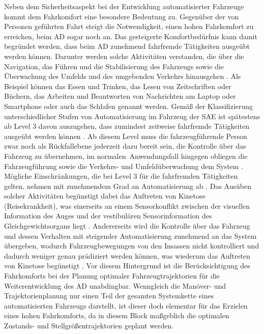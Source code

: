 Neben dem Sicherheitsaspekt bei der Entwicklung automatisierter Fahrzeuge kommt dem Fahrkomfort eine besondere Bedeutung zu. Gegenüber der von Personen geführten Fahrt steigt die Notwendigkeit, einen hohen Fahrkomfort zu erreichen, beim \gls{AD} sogar noch an. Das gesteigerte Komfortbedürfnis kann damit begründet werden, dass beim \gls{AD} zunehmend fahrfremde Tätigkeiten ausgeübt werden können. Darunter werden solche Aktivitäten verstanden, die über die Navigation, das Führen und die Stabilisierung des Fahrzeugs sowie die Überwachung des Umfelds und des umgebenden Verkehrs hinausgehen \cite{Festner.2019}. Als Beispiel können das Essen und Trinken, das Lesen von Zeitschriften oder Büchern, das Arbeiten und Beantworten von Nachrichten am Laptop oder Smartphone oder auch das Schlafen genannt werden. Gemäß der Klassifizierung unterschiedlicher Stufen von Automatisierung im Fahrzeug der \gls{SAE} \cite{SAETaxonomy.2018} ist spätestens ab Level 3 davon auszugehen, dass zumindest zeitweise fahrfremde Tätigkeiten ausgeübt werden können \cite{Festner.2019}. Ab diesem Level muss die fahrzeugführende Person zwar noch als Rückfallebene jederzeit dazu bereit sein, die Kontrolle über das Fahrzeug zu übernehmen, im \glqq normalen\grqq~Anwendungsfall hingegen obliegen die Fahrzeugführung sowie die Verkehrs- und Umfeldüberwachung dem System \cite{SAETaxonomy.2018}. Mögliche Einschränkungen, die bei Level 3 für die fahrfremden Tätigkeiten gelten, nehmen mit zunehmendem Grad an Automatisierung ab \cite{Festner.2019}. Das Ausüben solcher Aktivitäten begünstigt dabei das Auftreten von Kinetose (\glqq Reisekrankheit\grqq), was einerseits an einem Sensorkonflikt zwischen der visuellen Information des Auges und der vestibulären Sensorinformation des Gleichgewichtsorgans liegt \cite{Reason.1975,Golding.2006,Benson.2002}. Andererseits wird die Kontrolle über das Fahrzeug und dessen Verhalten mit steigender Automatisierung zunehmend an das System übergeben, wodurch Fahrzeugbewegungen von den Insassen nicht kontrolliert und dadurch weniger genau prädiziert werden können, was wiederum das Auftreten von Kinetose begünstigt \cite{Rolnick.1991}. Vor diesem Hintergrund ist die Berücksichtigung des Fahrkomforts bei der Planung optimaler Fahrzeugtrajektorien für die Weiterentwicklung des \gls{AD} unabdingbar. Wenngleich die Manöver- und Trajektorienplanung nur einen Teil der gesamten Systemkette eines automatisierten Fahrzeugs darstellt, ist dieser doch elementar für das Erzielen eines hohen Fahrkomforts, da in diesem Block maßgeblich die optimalen Zustands- und Stellgrößentrajektorien geplant werden. 


